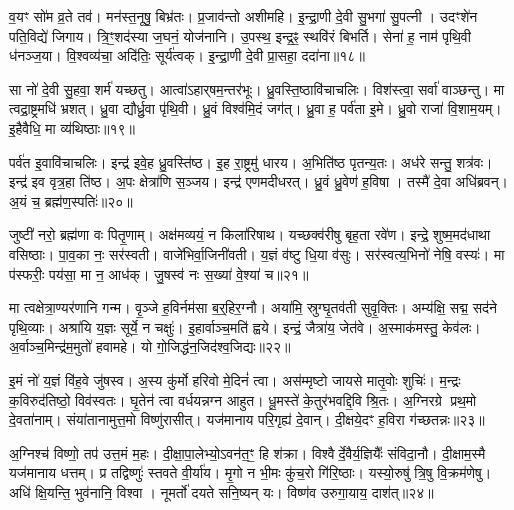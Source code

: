 व॒यꣳ सो॑म व्र॒ते तव॑।
मन॑स्त॒नूषु॒ बिभ्र॑तः।
प्र॒जाव॑न्तो अशीमहि।
इ॒न्द्रा॒णी दे॒वी सु॒भगा॑ सु॒पत्नी।
उदꣳशे॑न पति॒विद्ये॑ जिगाय।
त्रि॒ꣳ॒शद॑स्या ज॒घनं॒ योज॑नानि।
उ॒पस्थ॒ इन्द्र॒ꣴ॒ स्थवि॑रं बिभर्ति।
सेना॑ ह॒ नाम॑ पृथि॒वी ध॑नञ्ज॒या।
वि॒श्वव्य॑चा॒ अदि॑तिः॒ सूर्य॑त्वक्।
इ॒न्द्रा॒णी दे॒वी प्रा॒सहा॒ ददा॑ना॥१८॥

सा नो॑ दे॒वी सु॒हवा॒ शर्म॑ यच्छतु।
आत्वा॑\-ऽहार्‌\mbox{}षम॒न्तर॑भूः।
ध्रु॒वस्ति॒ष्ठावि॑चाचलिः।
विश॑स्त्वा॒ सर्वा॑ वाञ्छन्तु।
मा त्वद्रा॒ष्ट्रमधि॑ भ्रशत्।
ध्रु॒वा द्यौर्ध्रु॒वा पृ॑थि॒वी।
ध्रु॒वं विश्व॑मि॒दं जग॑त्।
ध्रु॒वा ह॒ पर्व॑ता इ॒मे।
ध्रु॒वो राजा॑ वि॒शाम॒यम्।
इ॒हैवैधि॒ मा व्य॑थिष्ठाः॥१९॥

पर्व॑त इ॒वावि॑चाचलिः।
इन्द्र॑ इवे॒ह ध्रु॒वस्ति॑ष्ठ।
इ॒ह रा॒ष्ट्रमु॑ धारय।
अ॒भिति॑ष्ठ पृतन्य॒तः।
अध॑रे सन्तु॒ शत्र॑वः।
इन्द्र॑ इव वृत्र॒हा ति॑ष्ठ।
अ॒पः क्षेत्रा॑णि स॒ञ्जय\sn{}।
इन्द्र॑ एणमदीधरत्।
ध्रु॒वं ध्रु॒वेण॑ ह॒विषा।
तस्मै॑ दे॒वा अधि॑ब्रवन्।
अ॒यं च॒ ब्रह्म॑ण॒स्पतिः॑॥२०॥\anuvakamend[ह॒विर्भि॑रा॒स्य॑मभि॒ दास॑तो विप॒श्चित॒मप्र॑यावञ्जी॒वसे॒ ददा॑ना व्यथिष्ठा ब्रव॒न्नेकं॑ च]

जुष्टी॑ नरो॒ ब्रह्म॑णा वः पितृ॒णाम्।
अक्ष॑मव्ययं॒ न किला॑रिषाथ।
यच्छक्व॑रीषु बृह॒ता रवे॑ण।
इन्द्रे॒ शुष्म॒मद॑धाथा वसिष्ठाः।
पा॒व॒का नः॒ सर॑स्वती।
वाजे॑भिर्वा॒जिनी॑वती।
य॒ज्ञं व॑ष्टु धि॒या व॑सुः।
सर॑स्वत्य॒भिनो॑ नेषि॒ वस्यः॑।
मा प॑स्फरीः॒ पय॑सा॒ मा न॒ आध॑क्।
जु॒षस्व॑ नः स॒ख्या॑ वे॒श्या॑ च॥२१॥

मा त्वक्षेत्रा॒ण्यर॑णानि गन्म।
वृ॒ञ्जे ह॒विर्नम॑सा ब॒र्॒हिर॒ग्नौ।
अया॑मि॒ स्रुग्घृ॒तव॑ती सुवृ॒क्तिः।
अम्य॑क्षि॒ सद्म॒ सद॑ने पृथि॒व्याः।
अश्रा॑यि य॒ज्ञः सूर्ये॒ न चक्षुः॑।
इ॒हार्वाञ्च॒मति॑ ह्वये।
इन्द्रं॒ जैत्रा॑य॒ जेत॑वे।
अ॒स्माक॑मस्तु॒ केव॑लः।
अ॒र्वाञ्च॒मिन्द्र॑म॒मुतो॑ हवामहे।
यो गो॒जिद्ध॑न॒जिद॑श्व॒\-जिद्यः॥२२॥

इ॒मं नो॑ य॒ज्ञं वि॑ह॒वे जु॑षस्व।
अ॒स्य कु॑र्मो हरिवो मे॒दिनं॑ त्वा।
अस॑म्मृष्टो जायसे मातृ॒वोः शुचिः॑।
म॒न्द्रः क॒विरुद॑तिष्ठो॒ विव॑स्वतः।
घृ॒तेन॑ त्वा वर्धयन्नग्न आहुत।
धू॒मस्ते॑ के॒तुर॑भवद्दि॒वि श्रि॒तः।
अ॒ग्निरग्रे प्रथ॒मो दे॒वता॑नाम्।
संया॑तानामुत्त॒मो विष्णु॑रासीत्।
यज॑मानाय परि॒गृह्य॑ दे॒वान्।
दी॒क्षये॒दꣳ ह॒विरा ग॑च्छतन्नः॥२३॥

अ॒ग्निश्च॑ विष्णो॒ तप॑ उत्त॒मं म॒हः।
दी॒क्षा॒पा॒लेभ्यो॒\-ऽवन॑त॒ꣳ॒ हि श॑क्रा।
विश्वैर्दे॒वैर्य॒ज्ञियैः᳚ संविदा॒नौ।
दी॒क्षाम॒स्मै यज॑मानाय धत्तम्।
प्र तद्विष्णुः॑ स्तवते वी॒र्या॑य।
मृ॒गो न भी॒मः कु॑च॒रो गि॑रि॒ष्ठाः।
यस्यो॒रुषु॑ त्रि॒षु वि॒क्रम॑णेषु।
अधि॑ क्षि॒यन्ति॒ भुव॑नानि॒ विश्वा।
नूमर्तो॑ दयते सनि॒ष्यन् यः।
विष्ण॑व उरुगा॒याय॒ दाश॑त्॥२४॥


